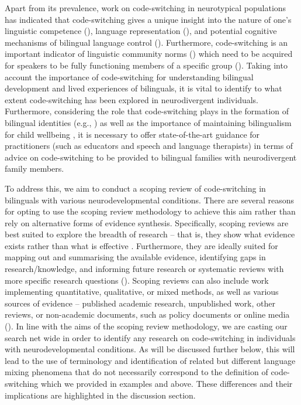 \documentclass[output=paper]{langscibook}
\begin{document}
Apart from its prevalence, work on code-switching in neurotypical populations has indicated that code-switching gives a unique insight into the nature of one’s linguistic competence (\citealt{Poplack1980,QuinYowEtAl2018,TruscottSharwoodSmith2017}), language representation (\citealt{TruscottSharwoodSmith2017}), and potential cognitive mechanisms of bilingual language control (\citealt{Hofweber2019}). Furthermore, code-switching is an important indicator of linguistic community norms (\citealt{Deuchar2020,ParafitaBalamnodate}) which need to be acquired for speakers to be fully functioning members of a specific group (\citealt{PhillipsDeuchar2021}). Taking into account the importance of code-switching for understanding bilingual development and lived experiences of bilinguals, it is vital to identify to what extent code-switching has been explored in neurodivergent individuals. Furthermore, considering the role that code-switching plays in the formation of bilingual identities (e.g.,  \citealt{MyersScotton1983, YimClément2021}) as well as the importance of maintaining bilingualism for child wellbeing \citep{MullerEtAl2020}, it is necessary to offer state-of-the-art guidance for practitioners (such as educators and speech and language therapists) in terms of advice on code-switching to be provided to bilingual families with neurodivergent family members.

To address this, we aim to conduct a scoping review of code-switching in bilinguals with various neurodevelopmental conditions. There are several reasons for opting to use the scoping review methodology to achieve this aim rather than rely on alternative forms of evidence synthesis. Specifically, scoping reviews are best suited to explore the breadth of research -- that is, they show what evidence exists rather than what is effective \citep{MunnEtAl2022}. Furthermore, they are ideally suited for mapping out and summarising the available evidence, identifying gaps in research/knowledge, and informing future research or systematic reviews with more specific research questions (\citealt{PetersEtAl2021updated, TriccoEtAl2018}). Scoping reviews can also include work implementing quantitative, qualitative, or mixed methods, as well as various sources of evidence -- published academic research, unpublished work, other reviews, or non-academic documents, such as policy documents or online media (\citealt{PetersEtAl2021scoping}). In line with the aims of the scoping review methodology, we are casting our search net wide in order to identify any research on code-switching in individuals with neurodevelopmental conditions. As will be discussed further below, this will lead to the use of terminology and identification of related but different language mixing phenomena that do not necessarily correspond to the definition of code-switching which we provided in examples  and  above. These differences and their implications are highlighted in the discussion section.
\end{document}
